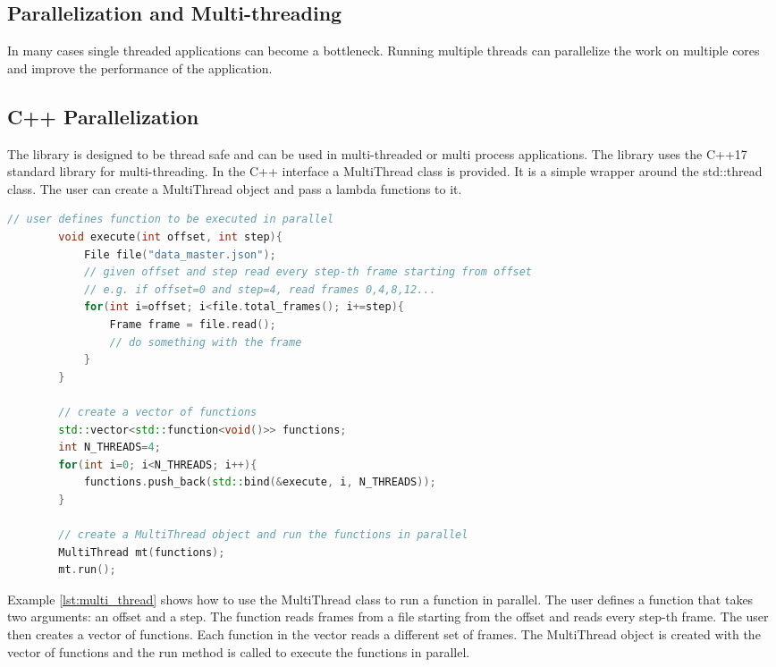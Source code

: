 \begin{spacing}{1.2}
    \section{Parallelization and Multi-threading}
    In many cases single threaded applications can become a bottleneck. Running multiple threads
    can parallelize the work on multiple cores and improve the performance of the application.

    \subsection{C++ Parallelization}

    The library is designed to be thread safe and can be used in multi-threaded or
    multi process applications. The library uses the C++17 standard library for multi-threading.
    In the C++ interface a MultiThread class is provided. It is a simple wrapper around the
    std::thread class. The user can create a MultiThread object and pass a lambda functions
    to it.

    \begin{lstlisting}[language=C++, caption=Example of using MultiThread class ,label=lst:multi_thread]
        // user defines function to be executed in parallel
        void execute(int offset, int step){
            File file("data_master.json");
            // given offset and step read every step-th frame starting from offset
            // e.g. if offset=0 and step=4, read frames 0,4,8,12...
            for(int i=offset; i<file.total_frames(); i+=step){
                Frame frame = file.read();
                // do something with the frame
            }
        }

        // create a vector of functions
        std::vector<std::function<void()>> functions;
        int N_THREADS=4;
        for(int i=0; i<N_THREADS; i++){
            functions.push_back(std::bind(&execute, i, N_THREADS));
        }

        // create a MultiThread object and run the functions in parallel
        MultiThread mt(functions);
        mt.run();
    \end{lstlisting}

    Example \ref{lst:multi_thread} shows how to use the MultiThread class to run a function in parallel.
    The user defines a function that takes two arguments: an offset and a step. The function reads frames
    from a file starting from the offset and reads every step-th frame. The user then creates a vector of
    functions. Each function in the vector reads a different set of frames. The MultiThread object is created
    with the vector of functions and the run method is called to execute the functions in parallel.\\


\end{spacing}
